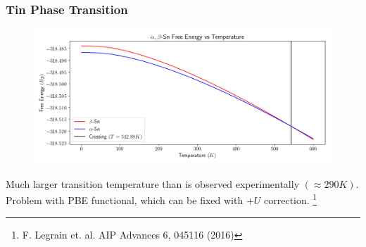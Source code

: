 \documentclass{beamer}
\begin{document}
\begin{frame}
	\frametitle{Tin Phase Transition}
	\begin{figure}[ht]
	\begin{center}
	\includegraphics[height=2in]{tin_transition_temperature.png}
	\end{center}
	\end{figure}
\pause
\begin{center}Much larger transition temperature than is observed experimentally $(\approx 290K)$. Problem with PBE functional, which can be fixed with $+U$ correction. \footnote{F. Legrain et. al. AIP Advances 6, 045116 (2016)}\end{center}
\end{frame}
\end{document}
